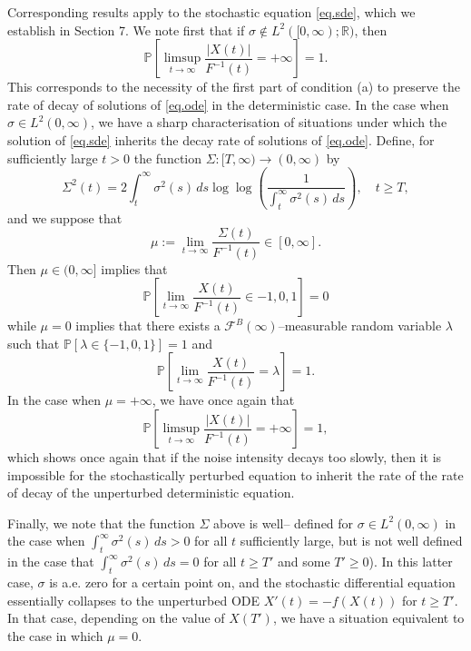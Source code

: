 \documentclass[a4paper,10pt,reqno]{amsart}
\numberwithin{equation}{section}
\theoremstyle{definition}
\theoremstyle{remark}
\DeclareMathOperator{\1}{\mathbbm 1}
\begin{document}
	Corresponding results apply to the stochastic equation \eqref{eq.sde}, which we establish in Section 7. We note first that if $\sigma\not\in L^2([0,\infty);\mathbb{R})$, then 
	\[
	\mathbb{P}\left[\limsup_{t\to\infty} \frac{|X(t)|}{F^{-1}(t)} =+\infty  \right]=1.
	\]
	This corresponds to the necessity of the first part of condition (a) to preserve the rate of decay of solutions of \eqref{eq.ode} in the deterministic case. 
	In the case when $\sigma\in L^2(0,\infty)$, we have a sharp characterisation of situations under which the solution of \eqref{eq.sde} inherits the decay rate of solutions of \eqref{eq.ode}. Define, for sufficiently large $t>0$ the function $\Sigma:[T,\infty)\to (0,\infty)$ by  
	\[
	\Sigma^2(t)=2\int_t^\infty \sigma^2(s)\,ds \log\log\left(\frac{1}{\int_t^\infty \sigma^2(s)\,ds}\right), \quad t\geq T,
	\] 
	and we suppose that 
	\[
	\mu:=\lim_{t\to\infty} \frac{\Sigma(t)}{F^{-1}(t)} \in  [0,\infty].
	\]
	Then $\mu\in (0,\infty]$ implies that 
	\[
	\mathbb{P}\left[\lim_{t\to\infty} \frac{X(t)}{F^{-1}(t)} \in {-1,0,1} \right] =0 
	\]
	while $\mu=0$ implies that there exists a $\mathcal{F}^B(\infty)$--measurable random variable $\lambda$ such that $\mathbb{P}[\lambda\in \{-1,0,1\}]=1$ and 
	\[
	\mathbb{P}\left[\lim_{t\to\infty} \frac{X(t)}{F^{-1}(t)}=\lambda\right]=1.
	\]
	In the case when $\mu=+\infty$, we have once again that 
	\[
	\mathbb{P}\left[\limsup_{t\to\infty} \frac{|X(t)|}{F^{-1}(t)} =+\infty  \right]=1,
	\]
	which shows once again that if the noise intensity decays too slowly, then it is impossible for the stochastically perturbed equation to inherit the rate of the rate of decay of the unperturbed deterministic equation. 
	
	Finally, we note that the function $\Sigma$ above is well-- defined for $\sigma\in L^2(0,\infty)$ in the case when 
	$\int_t^\infty \sigma^2(s)\,ds >0$ for all $t$ sufficiently large, but is not well defined in the case that $\int_t^\infty \sigma^2(s)\,ds=0$ for all $t\geq T'$ and some $T'\geq 0$). In this latter case, $\sigma$ is a.e. zero for a certain point on, and the stochastic differential equation essentially collapses to the unperturbed ODE $X'(t)=-f(X(t))$ for $t\geq T'$. In that case, depending on the value of $X(T')$, we have a situation equivalent to the case in which $\mu=0$.   
	
\end{document}
